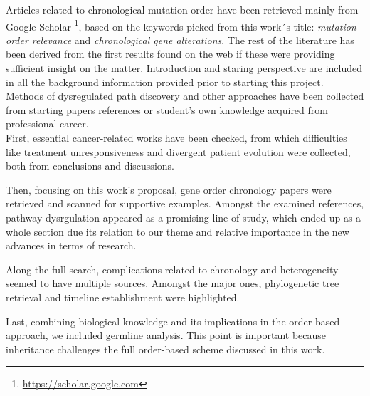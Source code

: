 Articles related to chronological mutation order have been retrieved mainly from Google Scholar \footnote{\url{https://scholar.google.com}}, based on the keywords picked from this work´s title: \emph{mutation order relevance} and \emph{chronological gene alterations}. The rest of the literature has been derived from the first results found on the web if these were providing sufficient insight on the matter.
Introduction and staring perspective are included in all the background information provided prior to starting this project.
\\

Methods of dysregulated path discovery and other approaches have been collected from starting papers references or student’s own knowledge acquired from professional career.
\\

First, essential cancer-related works have been checked, from which difficulties like treatment unresponsiveness and divergent patient evolution were collected, both from conclusions and discussions.

Then, focusing on this work's proposal, gene order chronology papers were retrieved and scanned for supportive examples. Amongst the examined references, pathway dysrgulation appeared as a promising line of study, which ended up as a whole section due its relation to our theme and relative importance in the new advances in terms of research.

Along the full search, complications related to chronology and heterogeneity seemed to have multiple sources. Amongst the major ones, phylogenetic tree retrieval and timeline establishment were highlighted.

Last, combining biological knowledge and its implications in the order-based approach, we included germline analysis. This point is important because inheritance challenges the full order-based scheme discussed in this work.